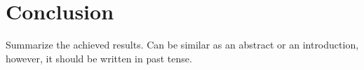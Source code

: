 
\chapter{Conclusion\label{chap:conclusion_p}}

Summarize the achieved results.
Can be similar as an abstract or an introduction, however, it should be written in past tense.
